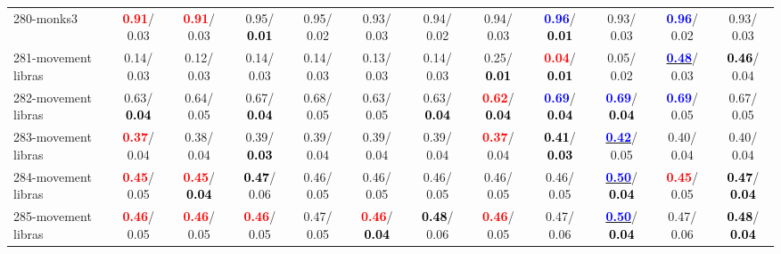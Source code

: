 \begin{table}[h]
\begin{center}
{\begin{tabular}{lc|c|c|c|c|c|c|c|c|c|c}
280-monks3 & \textcolor{red}{\textbf{  0.91}}/  0.03 & \textcolor{red}{\textbf{  0.91}}/  0.03 &   0.95/\textcolor{black}{\textbf{  0.01}} &   0.95/  0.02 &   0.93/  0.03 &   0.94/  0.02 &   0.94/  0.03 & \textcolor{blue}{\textbf{  0.96}}/\textcolor{black}{\textbf{  0.01}} &   0.93/  0.03 & \textcolor{blue}{\textbf{  0.96}}/  0.02 &   0.93/  0.03 \\
281-movement libras &   0.14/  0.03 &   0.12/  0.03 &   0.14/  0.03 &   0.14/  0.03 &   0.13/  0.03 &   0.14/  0.03 &   0.25/\textcolor{black}{\textbf{  0.01}} & \textcolor{red}{\textbf{  0.04}}/\textcolor{black}{\textbf{  0.01}} &   0.05/  0.02 & \underline{\textcolor{blue}{\textbf{  0.48}}}/  0.03 & \textcolor{black}{\textbf{  0.46}}/  0.04 \\
282-movement libras &   0.63/\textcolor{black}{\textbf{  0.04}} &   0.64/  0.05 &   0.67/\textcolor{black}{\textbf{  0.04}} &   0.68/  0.05 &   0.63/  0.05 &   0.63/\textcolor{black}{\textbf{  0.04}} & \textcolor{red}{\textbf{  0.62}}/\textcolor{black}{\textbf{  0.04}} & \textcolor{blue}{\textbf{  0.69}}/\textcolor{black}{\textbf{  0.04}} & \textcolor{blue}{\textbf{  0.69}}/\textcolor{black}{\textbf{  0.04}} & \textcolor{blue}{\textbf{  0.69}}/  0.05 &   0.67/  0.05 \\
283-movement libras & \textcolor{red}{\textbf{  0.37}}/  0.04 &   0.38/  0.04 &   0.39/\textcolor{black}{\textbf{  0.03}} &   0.39/  0.04 &   0.39/  0.04 &   0.39/  0.04 & \textcolor{red}{\textbf{  0.37}}/  0.04 & \textcolor{black}{\textbf{  0.41}}/\textcolor{black}{\textbf{  0.03}} & \underline{\textcolor{blue}{\textbf{  0.42}}}/  0.05 &   0.40/  0.04 &   0.40/  0.04 \\
284-movement libras & \textcolor{red}{\textbf{  0.45}}/  0.05 & \textcolor{red}{\textbf{  0.45}}/\textcolor{black}{\textbf{  0.04}} & \textcolor{black}{\textbf{  0.47}}/  0.06 &   0.46/  0.05 &   0.46/  0.05 &   0.46/  0.05 &   0.46/  0.05 &   0.46/  0.05 & \underline{\textcolor{blue}{\textbf{  0.50}}}/\textcolor{black}{\textbf{  0.04}} & \textcolor{red}{\textbf{  0.45}}/  0.05 & \textcolor{black}{\textbf{  0.47}}/\textcolor{black}{\textbf{  0.04}} \\ \hline
285-movement libras & \textcolor{red}{\textbf{  0.46}}/  0.05 & \textcolor{red}{\textbf{  0.46}}/  0.05 & \textcolor{red}{\textbf{  0.46}}/  0.05 &   0.47/  0.05 & \textcolor{red}{\textbf{  0.46}}/\textcolor{black}{\textbf{  0.04}} & \textcolor{black}{\textbf{  0.48}}/  0.06 & \textcolor{red}{\textbf{  0.46}}/  0.05 &   0.47/  0.06 & \underline{\textcolor{blue}{\textbf{  0.50}}}/\textcolor{black}{\textbf{  0.04}} &   0.47/  0.06 & \textcolor{black}{\textbf{  0.48}}/\textcolor{black}{\textbf{  0.04}} \\

\end{tabular}}
\end{center}
\end{table}
